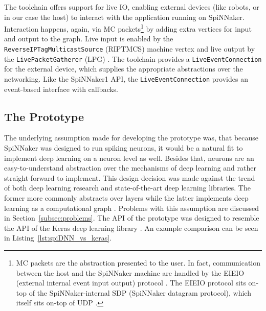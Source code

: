 \documentclass[]{article}
\begin{document}
The toolchain offers support for live IO, enabling external devices
(like robots, or in our case the host) to interact with the
application running on SpiNNaker.
Interaction happens, again, via MC packets\footnote{%
  MC packets are the abstraction presented to the user. In fact,
  communication between the host and the SpiNNaker machine are handled
  by the EIEIO (external internal event input output) protocol
  \citep{rast_et_al_2015}.
  The EIEIO protocol sits on-top of the SpiNNaker-internal SDP
  (SpiNNaker datagram protocol), which itself sits on-top of UDP
  \citep{furber_et_al_2014}.
}
by adding extra vertices for input and output to the graph.
Live input is enabled by the \texttt{ReverseIPTagMulticastSource}
(RIPTMCS) machine vertex and live output by the
\texttt{LivePacketGatherer} (LPG) \citep{furber_et_al_2020}.
The toolchain provides a \texttt{LiveEventCon\-nection} for the
external device, which supplies the appropriate abstractions over the
networking.
Like the SpiNNaker1 API, the \texttt{Live\-Event\-Con\-nection}
provides an event-based interface with callbacks.



\subsection{The Prototype} %
\label{subsec:SpiDNN_arch}

The underlying assumption made for developing the prototype was,
that because SpiNNaker was designed to run spiking neurons, it would
be a natural fit to implement deep learning on a neuron level as well.
Besides that, neurons are an easy-to-understand abstraction over the
mechanisms of deep learning and rather straight-forward to implement.
This design decision was made against the trend of both deep learning
research and state-of-the-art deep learning libraries.
The former more commonly abstracts over layers while the latter
implements deep learning as a computational graph
\citep{goodfellow_et_al_2016}.
Problems with this assumption are discussed in
Section~\ref{subsec:problems}.
The API of the prototype was designed to resemble the API of the Keras
deep learning library \citep{keras}.
An example comparison can be seen in
Listing~\ref{lst:spiDNN_vs_keras}.
\end{document}

